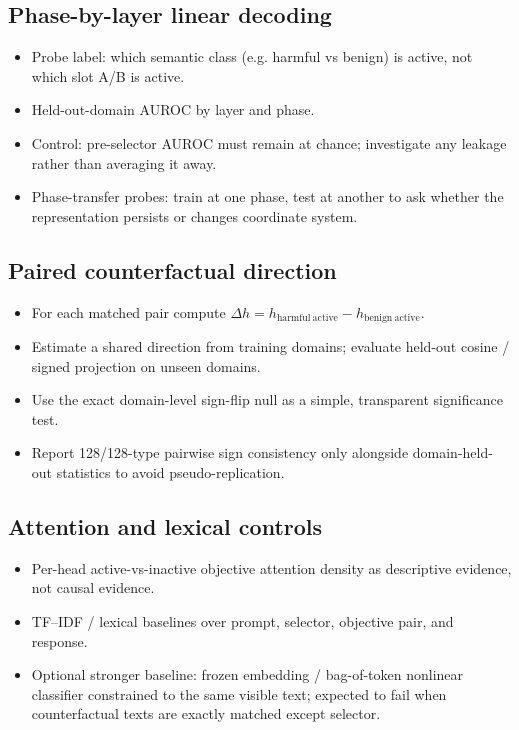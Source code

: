 \documentclass[10pt]{article}
\newcommand{\paperidea}[1]{\item #1}
\begin{document}
\subsection{Phase-by-layer linear decoding}
\begin{itemize}
  \paperidea{Probe label: which semantic class (e.g. harmful vs benign) is active, not which slot A/B is active.}
  \paperidea{Held-out-domain AUROC by layer and phase.}
  \paperidea{Control: pre-selector AUROC must remain at chance; investigate any leakage rather than averaging it away.}
  \paperidea{Phase-transfer probes: train at one phase, test at another to ask whether the representation persists or changes coordinate system.}
\end{itemize}

\subsection{Paired counterfactual direction}
\begin{itemize}
  \paperidea{For each matched pair compute $\Delta h = h_{\mathrm{harmful\ active}} - h_{\mathrm{benign\ active}}$.}
  \paperidea{Estimate a shared direction from training domains; evaluate held-out cosine / signed projection on unseen domains.}
  \paperidea{Use the exact domain-level sign-flip null as a simple, transparent significance test.}
  \paperidea{Report 128/128-type pairwise sign consistency only alongside domain-held-out statistics to avoid pseudo-replication.}
\end{itemize}

\subsection{Attention and lexical controls}
\begin{itemize}
  \paperidea{Per-head active-vs-inactive objective attention density as descriptive evidence, not causal evidence.}
  \paperidea{TF--IDF / lexical baselines over prompt, selector, objective pair, and response.}
  \paperidea{Optional stronger baseline: frozen embedding / bag-of-token nonlinear classifier constrained to the same visible text; expected to fail when counterfactual texts are exactly matched except selector.}
\end{itemize}
\end{document}
